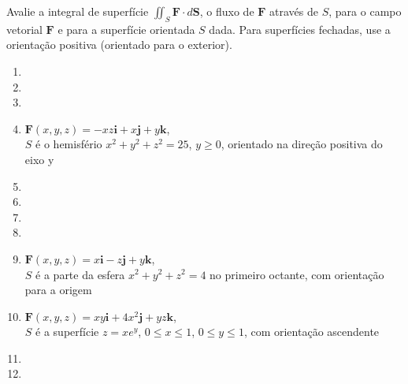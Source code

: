 	\vspace{5mm}
	
	Avalie a integral de superfície $\displaystyle \iint_S \textbf{F} \cdot d\textbf{S}$, o fluxo de $\textbf{F}$ através de $S$, para o campo vetorial $\textbf{F}$ e para a superfície orientada $S$ dada. Para superfícies fechadas, use a orientação positiva (orientado para o exterior).
	
	\begin{enumerate}[resume]

		\item
		\resposta{}

		\item
		\resposta{}

		\item
		\resposta{}

		\item $\textbf{F}(x,y,z) = -xz\textbf{i} + x\textbf{j} + y\textbf{k}$, \\ $S$ é o hemisfério $x^2 + y^2 + z^2 = 25$, $y \geq 0$, orientado na direção positiva do eixo y \\
		\resposta{\fazer}

		\item
		\resposta{}

		\item
		\resposta{}

		\item
		\resposta{}

		\item
		\resposta{}

		\item $\textbf{F}(x,y,z) = x\textbf{i} - z\textbf{j} + y\textbf{k}$, \\ $S$ é a parte da esfera $x^2 + y^2 + z^2 = 4$ no primeiro octante, com orientação para a origem
		\resposta{\fazer}

		\item $\textbf{F}(x,y,z) = xy\textbf{i} + 4x^{2}\textbf{j} + yz\textbf{k}$, \\ $S$ é a superfície $z = xe^y$, $0 \leq x \leq 1$, $0 \leq y \leq 1$, com orientação ascendente
		\resposta{\fazer}

		\item
		\resposta{}

		\item
		\resposta{}
	
	\end{enumerate}
		
	\vspace{5mm}	
	
	


